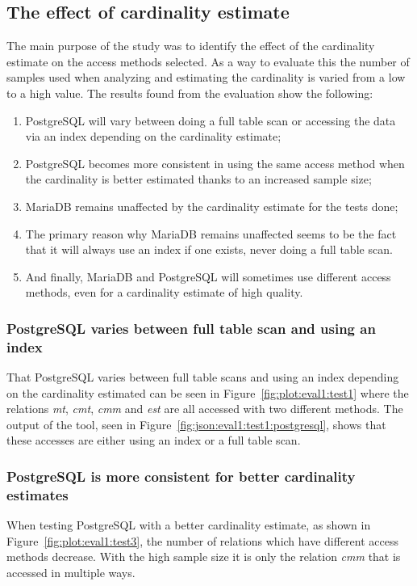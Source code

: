 \subsection{The effect of cardinality estimate}
The main purpose of the study was to identify the effect of the cardinality
estimate on the access methods selected. As a way to evaluate this the number of
samples used when analyzing and estimating the cardinality is varied from a low
to a high value. The results found from the evaluation show the following:
\begin{enumerate}
\item PostgreSQL will vary between doing a full table scan or accessing the data
  via an index depending on the cardinality estimate;
\item PostgreSQL becomes more consistent in using the same access method when
  the cardinality is better estimated thanks to an increased sample size;
\item MariaDB remains unaffected by the cardinality estimate for the tests done;
\item The primary reason why MariaDB remains unaffected seems to be the fact
  that it will always use an index if one exists, never doing a full table scan.
\item And finally, MariaDB and PostgreSQL will sometimes use different access
  methods, even for a cardinality estimate of high quality.
\end{enumerate}

\subsubsection{PostgreSQL varies between full table scan and using an index}
That PostgreSQL varies between full table scans and using an index depending on
the cardinality estimated can be seen in Figure~\ref{fig:plot:eval1:test1} where
the relations \textit{mt}, \textit{cmt}, \textit{cmm} and \textit{est} are all
accessed with two different methods. The output of the tool, seen in
Figure~\ref{fig:json:eval1:test1:postgresql}, shows that these accesses are
either using an index or a full table scan.

\subsubsection{PostgreSQL is more consistent for better cardinality estimates}
When testing PostgreSQL with a better cardinality estimate, as shown in
Figure~\ref{fig:plot:eval1:test3}, the number of relations which have different
access methods decrease. With the high sample size it is only the relation
\textit{cmm} that is accessed in multiple ways.

